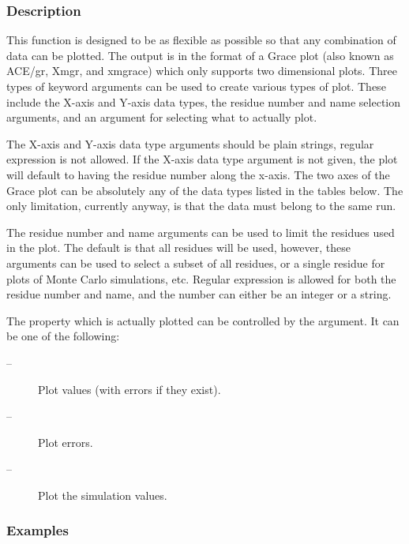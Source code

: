 \subsubsection{Description}

This function is designed to be as flexible as possible so that any combination of data can be plotted.  The output is in the format of a Grace plot (also known as ACE/gr, Xmgr, and xmgrace) which only supports two dimensional plots.  Three types of keyword arguments can be used to create various types of plot.  These include the X-axis and Y-axis data types, the residue number and name selection arguments, and an argument for selecting what to actually plot.


The X-axis and Y-axis data type arguments should be plain strings, regular expression is not allowed.  If the X-axis data type argument is not given, the plot will default to having the residue number along the x-axis.  The two axes of the Grace plot can be absolutely any of the data types listed in the tables below.  The only limitation, currently anyway, is that the data must belong to the same run.


The residue number and name arguments can be used to limit the residues used in the plot. The default is that all residues will be used, however, these arguments can be used to select a subset of all residues, or a single residue for plots of Monte Carlo simulations, etc.  Regular expression is allowed for both the residue number and name, and the number can either be an integer or a string.


The property which is actually plotted can be controlled by the  argument.  It can be one of the following:


\begin{description}
\item[ --]  Plot values (with errors if they exist). 
\item[ --]  Plot errors. 
\item[ --]   Plot the simulation values. 
\end{description}



\subsubsection{Examples}

